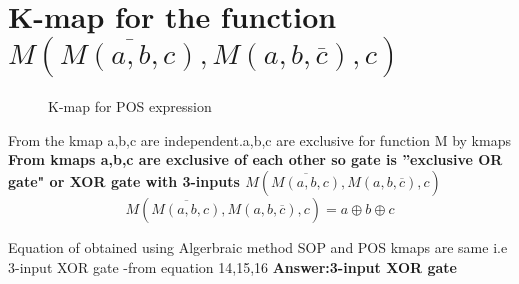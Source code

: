 \documentclass{article}
\begin{document}
\section{K-map for the function $M(\overline{M(a,b,c)},M(a,b,\overline{c}),c)$}
\begin{figure}[h]
\centering

\caption{K-map for POS expression}
\label{kmap_POS}
\end{figure} 

From the kmap a,b,c are independent.a,b,c are exclusive for function M by kmaps
\newline\textbf{From kmaps a,b,c are exclusive of each other so gate is ''exclusive OR gate" or XOR gate with 3-inputs $M(\overline{M(a,b,c)},M(a,b,\overline{c}),c)$   }        
\begin{equation}
  M(\overline{M(a,b,c)},M(a,b,\overline{c}),c)=a\oplus b\oplus c   
\end{equation}

Equation of obtained using Algerbraic method SOP and POS kmaps are same i.e 3-input XOR gate -from equation 14,15,16
\newline\textbf{Answer:3-input XOR gate}
\end{document}
